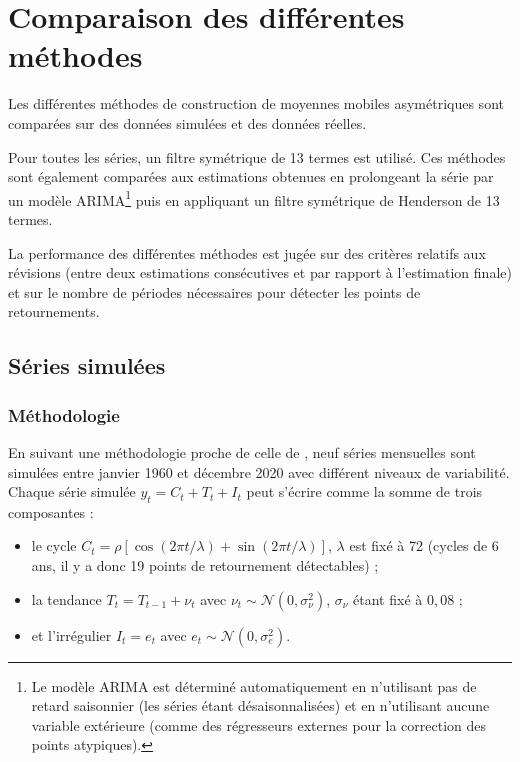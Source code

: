 \documentclass[
  12pt,
  a4paper,french]{article}
\newcommand\1{\mathds{1}}
\begin{document}
\hypertarget{sec-comparison}{%
\section{Comparaison des différentes méthodes}\label{sec-comparison}}

Les différentes méthodes de construction de moyennes mobiles asymétriques sont comparées sur des données simulées et des données réelles.

Pour toutes les séries, un filtre symétrique de 13 termes est utilisé.
Ces méthodes sont également comparées aux estimations obtenues en prolongeant la série par un modèle ARIMA\footnote{Le modèle ARIMA est déterminé automatiquement en n'utilisant pas de retard saisonnier (les séries étant désaisonnalisées) et en n'utilisant aucune variable extérieure (comme des régresseurs externes pour la correction des points atypiques).} puis en appliquant un filtre symétrique de Henderson de 13 termes.

La performance des différentes méthodes est jugée sur des critères relatifs aux révisions (entre deux estimations consécutives et par rapport à l'estimation finale) et sur le nombre de périodes nécessaires pour détecter les points de retournements.

\hypertarget{suxe9ries-simuluxe9es}{%
\subsection{Séries simulées}\label{suxe9ries-simuluxe9es}}

\hypertarget{muxe9thodologie}{%
\subsubsection{Méthodologie}\label{muxe9thodologie}}

En suivant une méthodologie proche de celle de \textcite{DarneDagum2009}, neuf séries mensuelles sont simulées entre janvier 1960 et décembre 2020 avec différent niveaux de variabilité.
Chaque série simulée \(y_t= C_t+ T_t + I_t\) peut s'écrire comme la somme de trois composantes :

\begin{itemize}
\item
  le cycle \(C_t = \rho [\cos (2 \pi t / \lambda) +\sin (2 \pi t / \lambda)]\), \(\lambda\) est fixé à 72 (cycles de 6 ans, il y a donc 19 points de retournement détectables) ;
\item
  la tendance \(T_t = T_{t-1} + \nu_t\) avec \(\nu_t \sim \mathcal{N}(0, \sigma_\nu^2)\), \(\sigma_\nu\) étant fixé à \(0,08\) ;
\item
  et l'irrégulier \(I_t = e_t\) avec \(e_t \sim \mathcal{N}(0, \sigma_e^2)\).
\end{itemize}
\end{document}
